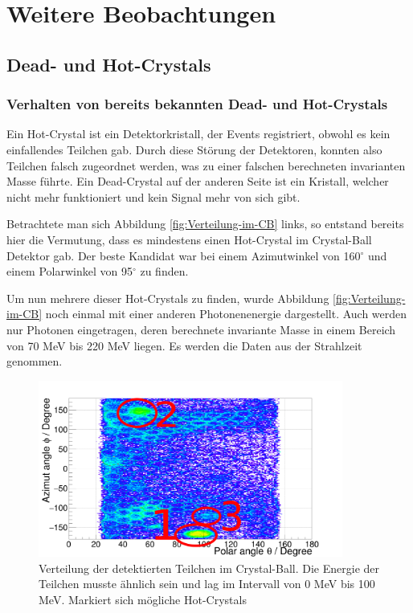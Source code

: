 \documentclass[a4paper,11pt,oneside,final,german,openbib,pdftex]{scrbook}
\begin{document}
{\chapter{Weitere Beobachtungen}
\label{sec:Weitere-Beobachtungen}

\section{Dead- und Hot-Crystals}
\subsection{Verhalten von bereits bekannten Dead- und Hot-Crystals}
\label{sec:Bekannte-Dead-Crystals}
Ein Hot-Crystal ist ein Detektorkristall, der Events registriert, obwohl es kein einfallendes Teilchen gab. Durch diese St\"orung der Detektoren, konnten also Teilchen falsch zugeordnet werden, was zu einer falschen berechneten invarianten Masse f\"uhrte. 
Ein Dead-Crystal auf der anderen Seite ist ein Kristall, welcher nicht mehr funktioniert und kein Signal mehr von sich gibt.

Betrachtete man sich Abbildung \ref{fig:Verteilung-im-CB} links, so entstand bereits hier die Vermutung, dass es mindestens einen Hot-Crystal im Crystal-Ball Detektor gab. Der beste Kandidat war bei einem Azimutwinkel von 160$^{\circ}$ und einem Polarwinkel von 95$^{\circ}$ zu finden.

Um nun mehrere dieser Hot-Crystals zu finden, wurde Abbildung \ref{fig:Verteilung-im-CB} noch einmal mit einer anderen Photonenenergie dargestellt. Auch werden nur Photonen eingetragen, deren berechnete invariante Masse in einem Bereich von 70 MeV bis 220 MeV liegen. Es werden die Daten aus der Strahlzeit genommen.

\begin{figure}[h!]
	\begin{center}
		\includegraphics[width=100mm]{NewCalib/Strahlzeit2014/ClusterSize/20172104StrahlzeitClusterSize0Marker}
	\end{center}
	\caption[Strahlzeit: Symmetrische Photonen; Markierte '\textit{Hot-Crystals}'; Niedrige Energien]{Verteilung der detektierten Teilchen im Crystal-Ball. Die Energie der Teilchen musste \"ahnlich sein und lag im Intervall von 0 MeV bis 100 MeV. Markiert sich m\"ogliche Hot-Crystals}
	\label{fig:Markierte-Hot-Crystals}
\end{figure}

}
\end{document}
